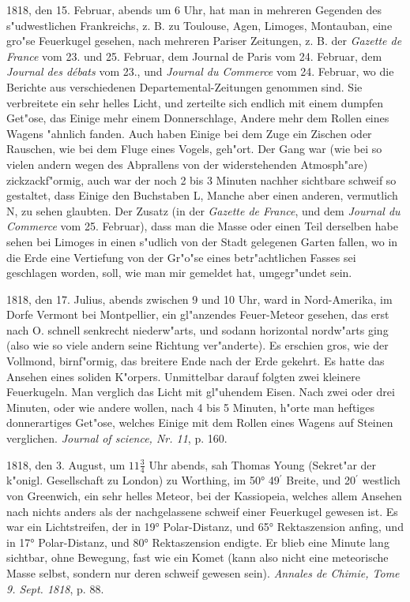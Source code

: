 \documentclass[a4paper, 11pt, oneside, polutonikogreek, german]{article}
\begin{document}
1818, den 15. Februar, abends um 6 Uhr, hat man in mehreren Gegenden des s"udwestlichen Frankreichs, z. B. zu Toulouse, Agen, Limoges, Montauban, eine gro"se Feuerkugel gesehen, nach mehreren Pariser Zeitungen, z. B. der \emph{Gazette de France} vom 23. und 25. Februar, dem Journal de Paris vom 24. Februar, dem \emph{Journal des débats} vom 23., und \emph{Journal du Commerce} vom 24. Februar, wo die Berichte aus verschiedenen Departemental-Zeitungen genommen sind. Sie verbreitete ein sehr helles Licht, und zerteilte sich endlich mit einem dumpfen Get"ose, das Einige mehr einem Donnerschlage, Andere mehr dem Rollen eines Wagens "ahnlich fanden. Auch haben Einige bei dem Zuge ein Zischen oder Rauschen, wie bei dem Fluge eines Vogels, geh"ort. Der Gang war (wie bei so vielen andern wegen des Abprallens von der widerstehenden Atmosph"are) zickzackf"ormig, auch war der noch 2 bis 3 Minuten nachher sichtbare schweif so gestaltet, dass Einige den Buchstaben L, Manche aber einen anderen, vermutlich N, zu sehen glaubten. Der Zusatz (in der \emph{Gazette de France}, und dem \emph{Journal du Commerce} vom 25. Februar), dass man die Masse oder einen Teil derselben habe sehen bei Limoges in einen s"udlich von der Stadt gelegenen Garten fallen, wo in die Erde eine Vertiefung von der Gr"o"se eines betr"achtlichen Fasses sei geschlagen worden, soll, wie man mir gemeldet hat, umgegr"undet sein.

1818, den 17. Julius, abends zwischen 9 und 10 Uhr, ward in Nord-Amerika, im Dorfe Vermont bei Montpellier, ein gl"anzendes Feuer-Meteor gesehen, das erst nach O. schnell senkrecht niederw"arts, und sodann horizontal nordw"arts ging (also wie so viele andern seine Richtung ver"anderte). Es erschien gros, wie der Vollmond, birnf"ormig, das breitere Ende nach der Erde gekehrt. Es hatte das Ansehen eines soliden K"orpers. Unmittelbar darauf folgten zwei kleinere Feuerkugeln. Man verglich das Licht mit gl"uhendem Eisen. Nach zwei oder drei Minuten, oder wie andere wollen, nach 4 bis 5 Minuten, h"orte man heftiges donnerartiges Get"ose, welches Einige mit dem Rollen eines Wagens auf Steinen verglichen. \emph{Journal of science, Nr. 11}, p. 160.

1818, den 3. August, um $\mathfrak{11\frac{3}{4}}$ Uhr abends, sah Thomas Young (Sekret"ar der k"onigl. Gesellschaft zu London) zu Worthing, im 50° 49$^{\prime}$ Breite, und 20$^{\prime}$ westlich von Greenwich, ein sehr helles Meteor, bei der Kassiopeia, welches allem Ansehen nach nichts anders als der nachgelassene schweif einer Feuerkugel gewesen ist. Es war ein Lichtstreifen, der in 19° Polar-Distanz, und 65° Rektaszension anfing, und in 17° Polar-Distanz, und 80° Rektaszension endigte. Er blieb eine Minute lang sichtbar, ohne Bewegung, fast wie ein Komet (kann also nicht eine meteorische Masse selbst, sondern nur deren schweif gewesen sein). \emph{Annales de Chimie, Tome 9. Sept. 1818}, p. 88.
\end{document}
